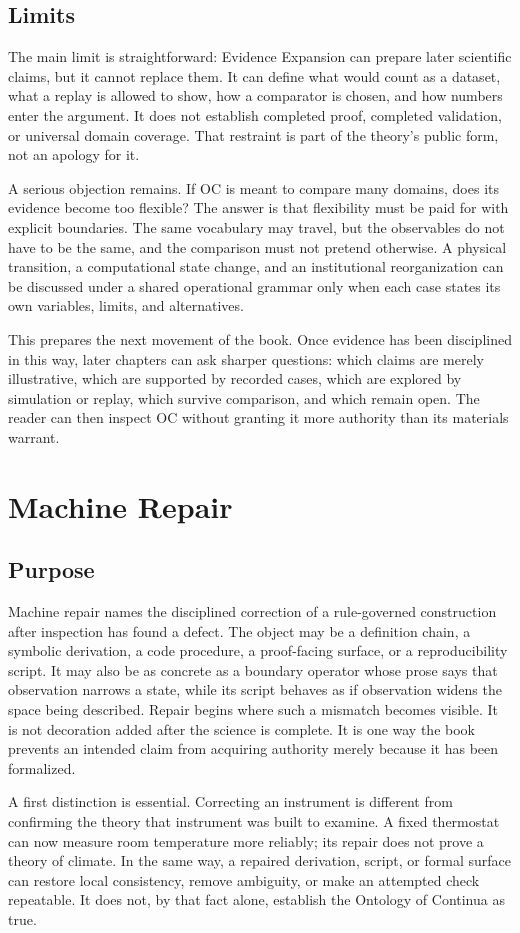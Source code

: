 \documentclass[11pt,a4paper,openany]{book}
\begin{document}
\subsection{Limits}
The main limit is straightforward: Evidence Expansion can prepare later scientific claims, but it cannot replace them. It can define what would count as a dataset, what a replay is allowed to show, how a comparator is chosen, and how numbers enter the argument. It does not establish completed proof, completed validation, or universal domain coverage. That restraint is part of the theory's public form, not an apology for it. \cite{goldenfeld_lectures,kadanoff_scaling}\par
A serious objection remains. If OC is meant to compare many domains, does its evidence become too flexible? The answer is that flexibility must be paid for with explicit boundaries. The same vocabulary may travel, but the observables do not have to be the same, and the comparison must not pretend otherwise. A physical transition, a computational state change, and an institutional reorganization can be discussed under a shared operational grammar only when each case states its own variables, limits, and alternatives.\par
This prepares the next movement of the book. Once evidence has been disciplined in this way, later chapters can ask sharper questions: which claims are merely illustrative, which are supported by recorded cases, which are explored by simulation or replay, which survive comparison, and which remain open. The reader can then inspect OC without granting it more authority than its materials warrant.\par
\section{Machine Repair}
\subsection{Purpose}
Machine repair names the disciplined correction of a rule-governed construction after inspection has found a defect. The object may be a definition chain, a symbolic derivation, a code procedure, a proof-facing surface, or a reproducibility script. It may also be as concrete as a boundary operator whose prose says that observation narrows a state, while its script behaves as if observation widens the space being described. Repair begins where such a mismatch becomes visible. It is not decoration added after the science is complete. It is one way the book prevents an intended claim from acquiring authority merely because it has been formalized. \cite{kadanoff_scaling,wilson_renormalization}\par
A first distinction is essential. Correcting an instrument is different from confirming the theory that instrument was built to examine. A fixed thermostat can now measure room temperature more reliably; its repair does not prove a theory of climate. In the same way, a repaired derivation, script, or formal surface can restore local consistency, remove ambiguity, or make an attempted check repeatable. It does not, by that fact alone, establish the Ontology of Continua as true.\par
\end{document}

